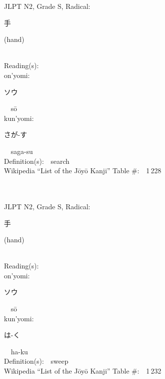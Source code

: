 \begin{multicols}{2}
{JLPT N2, Grade S, Radical:\ \ {\begin{CJK}{UTF8}{min} 手 \end{CJK}} (hand) } \\
Reading(s):\ \ \\
{\hspace*{1em}}on'yomi:\ \ \\
{\hspace*{2em}}{\begin{CJK}{UTF8}{min} ソウ \end{CJK}}\ \ s\=o\ \ \\
{\hspace*{1em}}kun'yomi:\ \ \\
{\hspace*{2em}}{\begin{CJK}{UTF8}{min} さが-す \end{CJK}}\ \ saga-su\ \ \\
Definition(s):\ \ search \\
Wikipedia ``List of the J\=oy\=o Kanji'' Table \#:\ \ 1\,228 \\
\ \ \\
{\fontsize{34pt}{40pt}  }\ \ \\  %
{JLPT N2, Grade S, Radical:\ \ {\begin{CJK}{UTF8}{min} 手 \end{CJK}} (hand) } \\
Reading(s):\ \ \\
{\hspace*{1em}}on'yomi:\ \ \\
{\hspace*{2em}}{\begin{CJK}{UTF8}{min} ソウ \end{CJK}}\ \ s\=o\ \ \\
{\hspace*{1em}}kun'yomi:\ \ \\
{\hspace*{2em}}{\begin{CJK}{UTF8}{min} は-く \end{CJK}}\ \ ha-ku\ \ \\
Definition(s):\ \ sweep \\
Wikipedia ``List of the J\=oy\=o Kanji'' Table \#:\ \ 1\,232 \\
\ \ \\
{\fontsize{34pt}{40pt}  }\ \ \\  %

\end{multicols}
